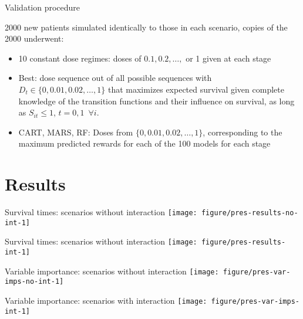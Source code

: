 \documentclass{beamer}
\begin{document}
\begin{frame}[t]{Validation procedure}
  
  2000 new patients simulated identically to those in each scenario, copies of the 2000 underwent:
  \begin{itemize}[<+(1)->]
    \item 10 constant dose regimes: doses of $0.1, 0.2, \ldots,$ or 1 given at each stage
    \item Best: dose sequence out of all possible sequences with $D_{t} \in \{0, 0.01, 0.02, \ldots, 1\}$ that maximizes expected survival given complete knowledge of the transition functions and their influence on survival, as long as $S_{it} \leq 1$, $t = 0, 1 \enspace \forall i$.
    \item CART, MARS, RF: Doses from $\{0, 0.01, 0.02, \ldots, 1\}$, corresponding to the maximum predicted rewards for each of the 100 models for each stage
  \end{itemize}
\end{frame}

\section{Results} %
\label{sec:results}


\begin{frame}[c]{Survival times: scenarios without interaction}
\centering
  \texttt{[image: figure/pres-results-no-int-1]} 
\end{frame}

\begin{frame}[c]{Survival times: scenarios without interaction}
  \centering
  \texttt{[image: figure/pres-results-int-1]} 
\end{frame}

\begin{frame}[c]{Variable importance: scenarios without interaction}
\centering
  \texttt{[image: figure/pres-var-imps-no-int-1]} 
\end{frame}

\begin{frame}[c]{Variable importance: scenarios with interaction}
  \centering
  \texttt{[image: figure/pres-var-imps-int-1]} 
\end{frame}
\end{document}
